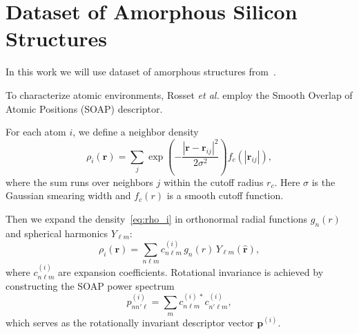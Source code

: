




\section{Dataset of Amorphous Silicon Structures}

In this work we will use dataset of amorphous structures from~\cite{rosset2024signaturesparacrystallinityamorphoussilicon}.

To characterize atomic environments, Rosset \emph{et al.} employ the Smooth
Overlap of Atomic Positions (SOAP) descriptor.


For each atom $i$, we define a neighbor density
\begin{equation}
  \rho_i(\mathbf{r})
  =
  \sum_{j}
  \exp\!\left(
    -\frac{|\mathbf{r}-\mathbf{r}_{ij}|^2}{2\sigma^2}
  \right)
  f_c(|\mathbf{r}_{ij}|),
  \label{eq:rho_i}
\end{equation}
where the sum runs over neighbors $j$ within the cutoff radius $r_c$.
Here $\sigma$ is the Gaussian smearing width and $f_c(r)$ is a smooth cutoff
function.


Then we expand the density~\eqref{eq:rho_i} in orthonormal radial functions
$g_n(r)$ and spherical harmonics $Y_{\ell m}$:
\begin{equation}
  \rho_i(\mathbf{r})
  =
  \sum_{n\ell m}
  c_{n\ell m}^{(i)}\,
  g_n(r)\,
  Y_{\ell m}(\hat{\mathbf{r}}),
  \label{eq:rho_expansion}
\end{equation}
where $c_{n\ell m}^{(i)}$ are expansion coefficients.
Rotational invariance is achieved by constructing the SOAP power spectrum
\begin{equation}
  p^{(i)}_{nn'\ell}
  =
  \sum_{m}
  c_{n\ell m}^{(i)\,*}
  c_{n'\ell m}^{(i)},
  \label{eq:SOAP_powerspec}
\end{equation}
which serves as the rotationally invariant descriptor vector
$\mathbf{p}^{(i)}$.

